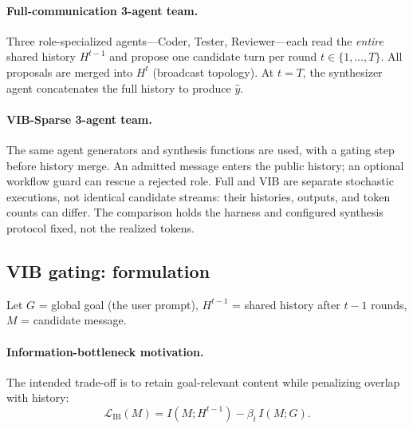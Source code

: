 \documentclass[11pt,twoside,twocolumn,letterpaper]{article}
\begin{document}
\paragraph{Full-communication 3-agent team.} Three role-specialized agents---Coder, Tester, Reviewer---each read the \emph{entire} shared history $H^{t-1}$ and propose one candidate turn per round $t \in \{1,\dots,T\}$. All proposals are merged into $H^t$ (broadcast topology). At $t=T$, the synthesizer agent concatenates the full history to produce $\hat y$.

\paragraph{VIB-Sparse 3-agent team.} The same agent generators and synthesis functions are used, with a gating step before history merge. An admitted message enters the public history; an optional workflow guard can rescue a rejected role. Full and VIB are separate stochastic executions, not identical candidate streams: their histories, outputs, and token counts can differ. The comparison holds the harness and configured synthesis protocol fixed, not the realized tokens.

\subsection{VIB gating: formulation}
Let $G$ = global goal (the user prompt), $H^{t-1}$ = shared history after $t-1$ rounds, $M$ = candidate message.

\paragraph{Information-bottleneck motivation.} The intended trade-off is to retain goal-relevant content while penalizing overlap with history:
\begin{equation}
\mathcal{L}_\text{IB}(M) = I(M; H^{t-1}) - \beta_t \, I(M; G).
\end{equation}
\end{document}
